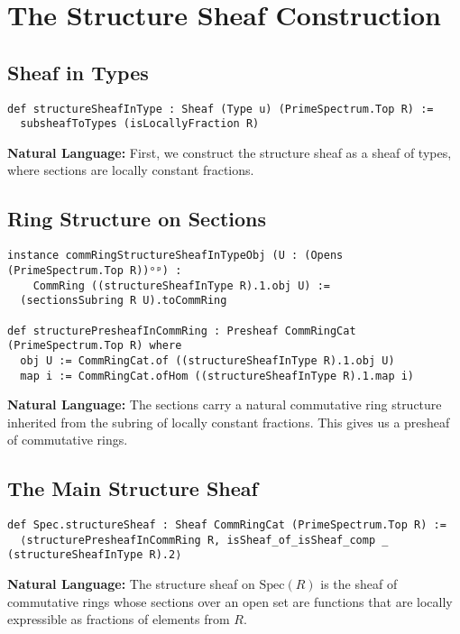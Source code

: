 \documentclass{article}
\theoremstyle{definition}
\begin{document}
\section{The Structure Sheaf Construction}

\subsection{Sheaf in Types}

\begin{lstlisting}
def structureSheafInType : Sheaf (Type u) (PrimeSpectrum.Top R) :=
  subsheafToTypes (isLocallyFraction R)
\end{lstlisting}

\textbf{Natural Language:} First, we construct the structure sheaf as a sheaf of types, where sections are locally constant fractions.

\subsection{Ring Structure on Sections}

\begin{lstlisting}
instance commRingStructureSheafInTypeObj (U : (Opens (PrimeSpectrum.Top R))ᵒᵖ) :
    CommRing ((structureSheafInType R).1.obj U) :=
  (sectionsSubring R U).toCommRing

def structurePresheafInCommRing : Presheaf CommRingCat (PrimeSpectrum.Top R) where
  obj U := CommRingCat.of ((structureSheafInType R).1.obj U)
  map i := CommRingCat.ofHom ((structureSheafInType R).1.map i)
\end{lstlisting}

\textbf{Natural Language:} The sections carry a natural commutative ring structure inherited from the subring of locally constant fractions. This gives us a presheaf of commutative rings.

\subsection{The Main Structure Sheaf}

\begin{lstlisting}
def Spec.structureSheaf : Sheaf CommRingCat (PrimeSpectrum.Top R) :=
  ⟨structurePresheafInCommRing R, isSheaf_of_isSheaf_comp _ (structureSheafInType R).2⟩
\end{lstlisting}

\textbf{Natural Language:} The structure sheaf on $\mathrm{Spec}(R)$ is the sheaf of commutative rings whose sections over an open set are functions that are locally expressible as fractions of elements from $R$.
\end{document}
